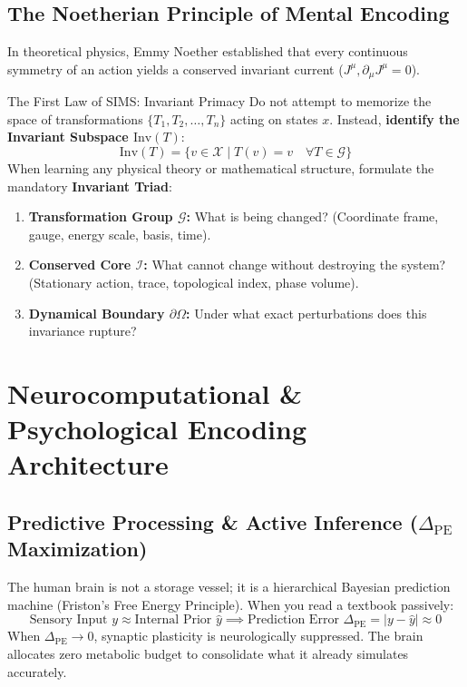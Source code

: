 \documentclass[11pt,a4paper]{article}
\begin{document}
\subsection{The Noetherian Principle of Mental Encoding}
In theoretical physics, Emmy Noether established that every continuous symmetry of an action yields a conserved invariant current ($J^\mu, \partial_\mu J^\mu = 0$). 

\begin{lawbox}{The First Law of SIMS: Invariant Primacy}
Do not attempt to memorize the space of transformations $\{T_1, T_2, \dots, T_n\}$ acting on states $x$. Instead, \textbf{identify the Invariant Subspace $\mathrm{Inv}(T)$}:
\begin{equation}
    \mathrm{Inv}(T) = \{ v \in \mathcal{X} \mid T(v) = v \quad \forall T \in \mathcal{G} \}
\end{equation}
When learning any physical theory or mathematical structure, formulate the mandatory \textbf{Invariant Triad}:
\begin{enumerate}
    \item \textbf{Transformation Group $\mathcal{G}$:} What is being changed? (Coordinate frame, gauge, energy scale, basis, time).
    \item \textbf{Conserved Core $\mathcal{I}$:} What cannot change without destroying the system? (Stationary action, trace, topological index, phase volume).
    \item \textbf{Dynamical Boundary $\partial \Omega$:} Under what exact perturbations does this invariance rupture?
\end{enumerate}
\end{lawbox}

\section{Neurocomputational \& Psychological Encoding Architecture}

\subsection{Predictive Processing \& Active Inference ($\Delta_{\text{PE}}$ Maximization)}
The human brain is not a storage vessel; it is a hierarchical Bayesian prediction machine (Friston's Free Energy Principle). When you read a textbook passively:
\[
\text{Sensory Input } y \approx \text{Internal Prior } \hat{y} \implies \text{Prediction Error } \Delta_{\text{PE}} = |y - \hat{y}| \approx 0
\]
When $\Delta_{\text{PE}} \to 0$, synaptic plasticity is neurologically suppressed. The brain allocates zero metabolic budget to consolidate what it already simulates accurately.
\end{document}
